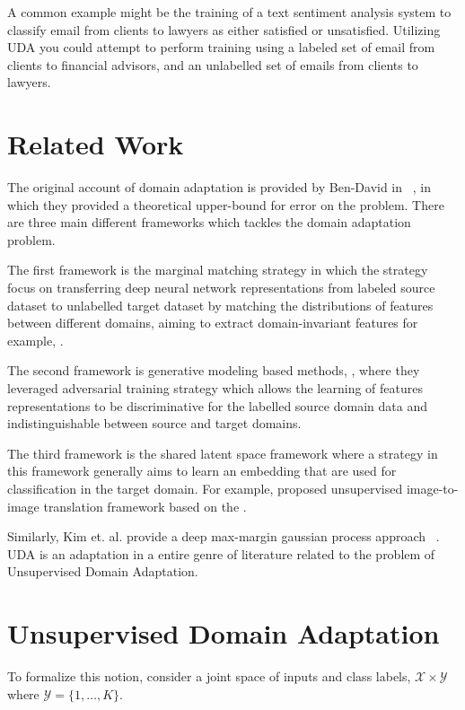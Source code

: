 \documentclass[10pt,twocolumn,letterpaper]{article}
\begin{document}
A common example might be the training of a text sentiment analysis system to classify email from clients to lawyers as either satisfied or unsatisfied. 
Utilizing UDA you could attempt to perform training using a labeled set of email from clients to financial advisors, and an unlabelled set of emails from clients to lawyers.

\section{Related Work}

The original account of domain adaptation is provided by Ben-David in ~\cite{ben2010theory}, in which they provided a theoretical upper-bound for error on the problem. 
There are three main different frameworks which tackles the domain adaptation problem.

The first framework is the marginal matching strategy in which the strategy focus on transferring deep neural network representations from labeled source dataset to unlabelled target dataset by matching the distributions of features between different domains, aiming to extract domain-invariant features for example, \cite{sun2016deep}. 

The second framework is generative modeling based methods, \cite{rebuffi2017learning} \cite{courty2017joint} \cite{benaim2017one}, where they leveraged adversarial training strategy which allows the learning of features representations to be discriminative for the labelled source domain data and indistinguishable between source and target domains.

The third framework is the shared latent space framework where a strategy in this framework generally aims to learn an embedding that are used for classification in the target domain. 
For example, \cite{liu2017unsupervised} proposed unsupervised image-to-image translation framework based on the \cite{liu2016coupled}.

Similarly, Kim et. al. provide a deep max-margin gaussian process approach ~\cite{kim2019unsupervised}. UDA is an adaptation in a entire genre of literature related to the problem of Unsupervised Domain Adaptation.  

\section{Unsupervised Domain Adaptation}
To formalize this notion, consider a joint space of inputs and class labels, \(\mathcal{X} \times \mathcal{Y}\) where \(\mathcal{Y} = \{1,\dots,K\}\). 
\end{document}
